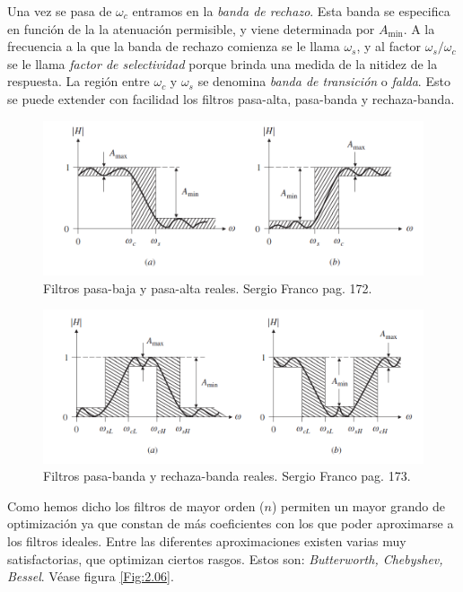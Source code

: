 \documentclass[12pt,a4paper]{article}
\numberwithin{equation}{section}
\numberwithin{figure}{section}
\begin{document}
Una vez se pasa de $\omega_c$ entramos en la \textit{banda de rechazo}. Esta banda se especifica en función de la la atenuación permisible, y viene determinada por $A_{\min}$. A la frecuencia a la que la banda de rechazo comienza se le llama $\omega_s$, y al factor $\omega_s / \omega_c$ se le llama \textit{factor de selectividad} porque brinda una medida de la nitidez de la respuesta. La región entre $\omega_c$ y $\omega_s$ se denomina \textit{banda de transición} o \textit{falda}. Esto se puede extender con facilidad los filtros pasa-alta, pasa-banda y rechaza-banda. \\


\begin{figure}[h!] \centering
\includegraphics[scale=0.9]{2.2-Reales1.png}
\caption{Filtros pasa-baja y pasa-alta reales. Sergio Franco pag. 172.}
\label{Fig:2.04}
\end{figure}

\begin{figure}[h!] \centering
\includegraphics[scale=0.9]{2.2-Reales2.png}
\caption{Filtros pasa-banda y rechaza-banda reales. Sergio Franco pag. 173.}
\label{Fig:2.05}
\end{figure}


Como hemos dicho los filtros de mayor orden ($n$) permiten un mayor grando de optimización ya que constan de más coeficientes con los que poder aproximarse a los filtros ideales. Entre las diferentes aproximaciones existen varias muy satisfactorias, que optimizan ciertos rasgos. Estos son: \textit{Butterworth, Chebyshev, Bessel}. Véase figura \ref{Fig:2.06}. \\
\end{document}
